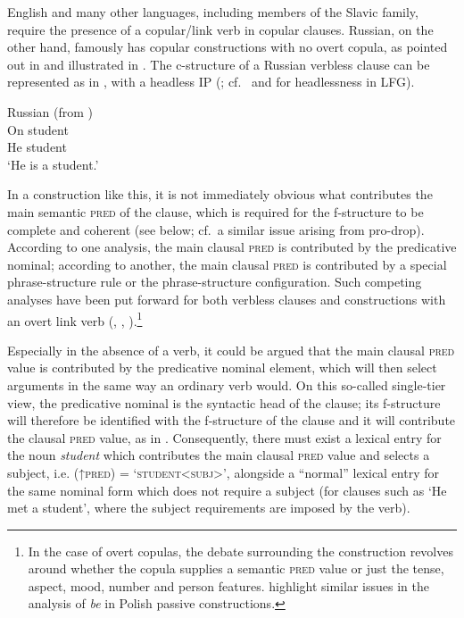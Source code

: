 \documentclass[output=paper,hidelinks]{langscibook}
\begin{document}
English and many other languages, including members of the Slavic family, require the presence of a copular/link verb in copular clauses. Russian, on the other hand, famously has copular constructions with no overt copula, as pointed out in  and illustrated in . The c-structure of a Russian verbless clause can be represented as in , with a headless IP (\citealt[191]{DLM:LFG}; cf.\  and  for headlessness in LFG).

\ea%
    \label{ex:Slavic:28}Russian (from \citealt[192]{dalrympleetal04copular})\\
\gll On   student\\
He   student\\
\glt`He is a student.'
\z


In a construction like this, it is not immediately obvious what contributes the main semantic \textsc{pred} of the clause, which is required for the f-structure to be complete and coherent (see  below; cf.\ a similar issue arising from pro-drop). According to one analysis, the main clausal \textsc{pred} is contributed by the predicative nominal; according to another, the main clausal \textsc{pred} is contributed by a special phrase-structure rule or the phrase-structure configuration. Such competing analyses have been put forward for both verbless clauses and constructions with an overt link verb (\citealt{dalrympleetal04copular}, \citealt[141--142]{NordlingerSadler2007}, \citealt[189ff.]{DLM:LFG}).\footnote{In the case of overt copulas, the debate surrounding the construction revolves around whether the copula supplies a semantic \textsc{pred} value or just the tense, aspect, mood, number and person features. \citet{PatejukPrzepiorkowski2014b} highlight similar issues in the analysis of \textit{be} in Polish passive constructions.}

Especially in the absence of a verb, it could be argued that the main clausal \textsc{pred} value is contributed by the predicative nominal element, which will then select arguments in the same way an ordinary verb would. On this so-called single-tier view, the predicative nominal is the syntactic head of the clause; its f-structure will therefore be identified with the f-structure of the clause and it will contribute the clausal \textsc{pred} value, as in . Consequently, there must exist a lexical entry for the noun \textit{student} which contributes the main clausal \textsc{pred} value and selects a subject, i.e. (↑\textsc{pred)} \textsc{=} \textsc{`student<subj}>', alongside a ``normal'' lexical entry for the same nominal form which does not require a subject (for clauses such as `He met a student', where the subject requirements are imposed by the verb). 
\end{document}
